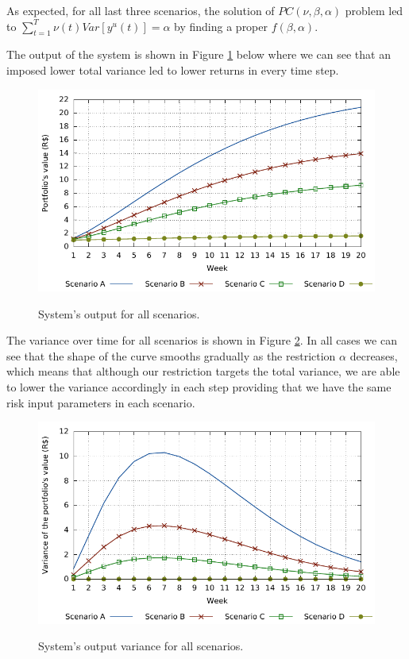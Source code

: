 As expected, for all last three scenarios, the solution of $PC(\nu,\beta,\alpha)$ problem led to $\sum_{t=1}^{T}\nu(t)Var[y^u(t)] = \alpha$ by finding a proper $f(\beta,\alpha)$.

The output of the system is shown in Figure \ref{fig:output} below where we can see that an imposed lower total variance led to lower returns in every time step.
%
\begin{figure} [h!]
	\caption{System's output for all scenarios.}
	\centering
	\includegraphics[width=6in,keepaspectratio]{figures/y_t}
	\label{fig:output}
\end{figure}

The variance over time for all scenarios is shown in Figure \ref{fig:var1}.
In all cases we can see that the shape of the curve smooths gradually as the restriction $\alpha$ decreases, which means that although our restriction targets the total variance, we are able to lower the variance accordingly in each step providing that we have the same risk input parameters in each scenario.
%
\begin{figure} [h!]
	\caption{System's output variance for all scenarios.}
	\centering
	\includegraphics[width=6in,keepaspectratio]{figures/var_1}
	\label{fig:var1}
\end{figure}


